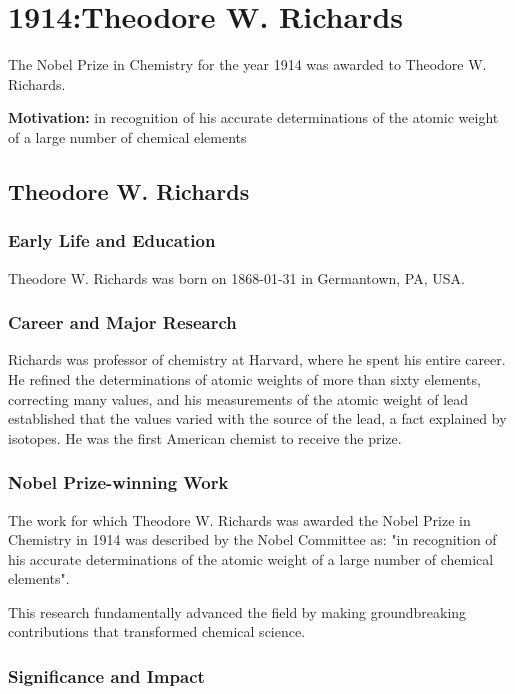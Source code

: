 \chapter{1914:Theodore W. Richards}
\label{chap:chemistry1914}

The Nobel Prize in Chemistry for the year 1914 was awarded to Theodore W. Richards.

\textbf{Motivation:}
in recognition of his accurate determinations of the atomic weight of a large number of chemical elements

\section{Theodore W. Richards}

\subsection*{Early Life and Education}

Theodore W. Richards was born on 1868-01-31 in Germantown, PA, USA.

\subsection*{Career and Major Research}

Richards was professor of chemistry at Harvard, where he spent his entire career. He refined the determinations of atomic weights of more than sixty elements, correcting many values, and his measurements of the atomic weight of lead established that the values varied with the source of the lead, a fact explained by isotopes. He was the first American chemist to receive the prize.

\subsection*{Nobel Prize-winning Work}

The work for which Theodore W. Richards was awarded the Nobel Prize in Chemistry in 1914 was described by the Nobel Committee as: "in recognition of his accurate determinations of the atomic weight of a large number of chemical elements".

This research fundamentally advanced the field by making groundbreaking contributions that transformed chemical science.

\subsection*{Significance and Impact}

